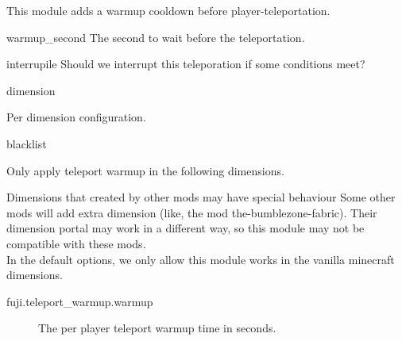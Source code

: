\label{ch:teleport_warmup}

This module adds a warmup cooldown before player-teleportation.

\begin{Configuration}
    \item[warmup\_second]{
        The second to wait before the teleportation.
    }

    \item[interrupile]{
        Should we interrupt this teleporation if some conditions meet?
    }

    \item[dimension]{
        Per dimension configuration.

        \begin{NestedList}
            \item[blacklist] {
                Only apply teleport warmup in the following dimensions.

                \begin{warn}{Dimensions that created by other mods may have special behaviour}
                    Some other mods will add extra dimension (like, the mod the-bumblezone-fabric).
                    Their dimension portal may work in a different way, so this module may not be compatible with these mods.\\
                    In the default options, we only allow this module works in the vanilla minecraft dimensions.
                \end{warn}
            }
        \end{NestedList}
    }
\end{Configuration}

\begin{description}
    \item [fuji.teleport\_warmup.warmup] The per player teleport warmup time in seconds.
\end{description}
